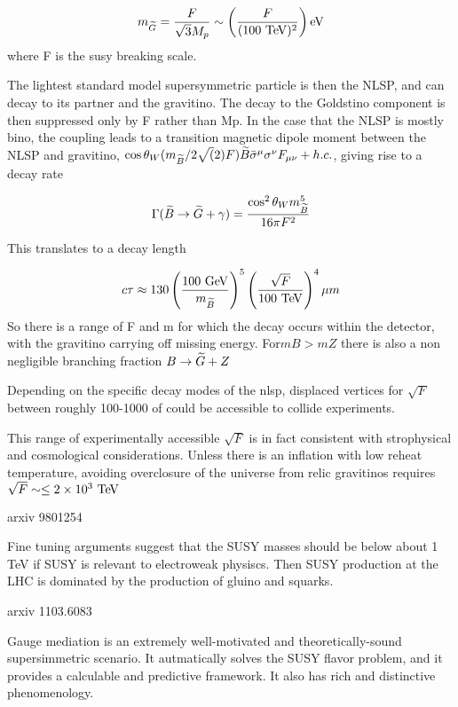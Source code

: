 \begin{equation*}
  m_{\gravino} = \frac{F}{\sqrt{3} M_p} \sim \left( \frac{F}{(100 \tev)^2} \right) \mathrm{eV}
\end{equation*}
where F is the susy breaking scale.

The lightest standard model supersymmetric
particle is then the NLSP, and can decay to its partner and the
gravitino.
The decay to the Goldstino component is then suppressed
only by F rather than Mp. In the case that the NLSP is mostly bino, the
coupling leads to a transition magnetic dipole moment between the NLSP
and gravitino, $\cos\theta_W (m_{\widetilde{B}}/2\sqrt(2) F) \widetilde{B} \bar{\sigma}^\mu \sigma^\nu F_{\mu\nu} + h.c.$,
giving rise to a decay rate

\begin{equation*}
  \Gamma(\bino\to \gravino + \gamma) = \frac{\cos^2\theta_W m_{\bino}^5}{16\pi F^2}
\end{equation*}

This translates to a decay length

\begin{equation}
  c\tau \approx 130 \left( \frac{100 \gev}{m_{\bino}} \right)^5 \left( \frac{\sqrt{F}}{100 \tev} \right)^4 \mu m
\end{equation}
So there is a range of F and m for which the decay occurs within the detector, with the gravitino carrying off missing energy. For$ mB > mZ$ there is
also a non negligible branching fraction $B\rightarrow\widetilde{G} + Z$

Depending on the specific decay modes of the nlsp, displaced vertices for $\sqrt{F}$ between roughly 100-1000 of \tev could be accessible to collide experiments.

This range of experimentally accessible $\sqrt{F}$ is in fact consistent with strophysical and cosmological considerations. Unless there is an inflation with low
reheat temperature, avoiding overclosure of the universe from relic gravitinos requires $\sqrt{F} \sim \leq 2 \times 10^3 \tev$






arxiv 9801254

Fine tuning arguments suggest that the SUSY masses should be below about 1 TeV if SUSY is relevant to electroweak physiscs.
Then SUSY production at the LHC is dominated by the production of gluino and squarks.

arxiv 1103.6083

Gauge mediation is an extremely well-motivated and theoretically-sound supersimmetric scenario. It autmatically solves the SUSY flavor
problem, and it provides a calculable and predictive framework. It also has rich and distinctive phenomenology.


